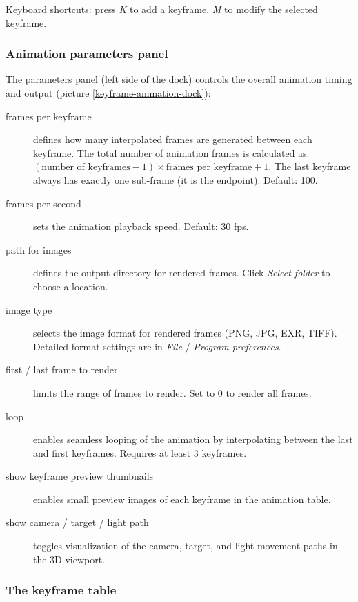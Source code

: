 Keyboard shortcuts: press \emph{K} to add a keyframe, \emph{M} to modify the selected keyframe.

\subsubsection{Animation parameters panel}

The parameters panel (left side of the dock) controls the overall animation timing and output (picture \ref{keyframe-animation-dock}):

\begin{description}
	\item[frames per keyframe] defines how many interpolated frames are generated between each keyframe. The total number of animation frames is calculated as: $(\text{number of keyframes} - 1) \times \text{frames per keyframe} + 1$. The last keyframe always has exactly one sub-frame (it is the endpoint). Default: 100.
	
	\item[frames per second] sets the animation playback speed. Default: 30 fps.
	
	\item[path for images] defines the output directory for rendered frames. Click \emph{Select folder} to choose a location.
	
	\item[image type] selects the image format for rendered frames (PNG, JPG, EXR, TIFF). Detailed format settings are in \emph{File} / \emph{Program preferences}.
	
	\item[first / last frame to render] limits the range of frames to render. Set to 0 to render all frames.
	
	\item[loop] enables seamless looping of the animation by interpolating between the last and first keyframes. Requires at least 3 keyframes.
	
	\item[show keyframe preview thumbnails] enables small preview images of each keyframe in the animation table.
	
	\item[show camera / target / light path] toggles visualization of the camera, target, and light movement paths in the 3D viewport.
\end{description}

\subsubsection{The keyframe table}

